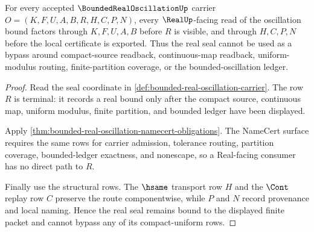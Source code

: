 \begin{theorem}
\label{thm:bounded-real-oscillation-real-seal-nonescape}
For every accepted $\BoundedRealOscillationUp$ carrier $O=(K,F,U,A,B,R,H,C,P,N)$, every $\RealUp$-facing read of the oscillation bound factors through $K,F,U,A,B$ before $R$ is visible, and through $H,C,P,N$ before the local certificate is exported. Thus the real seal cannot be used as a bypass around compact-source readback, continuous-map readback, uniform-modulus routing, finite-partition coverage, or the bounded-oscillation ledger.
\end{theorem}
\begin{proof}
Read the seal coordinate in \autoref{def:bounded-real-oscillation-carrier}. The row $R$ is terminal: it records a real bound only after the compact source, continuous map, uniform modulus, finite partition, and bounded ledger have been displayed.

Apply \autoref{thm:bounded-real-oscillation-namecert-obligations}. The NameCert surface requires the same rows for carrier admission, tolerance routing, partition coverage, bounded-ledger exactness, and nonescape, so a Real-facing consumer has no direct path to $R$.

Finally use the structural rows. The $\hsame$ transport row $H$ and the $\Cont$ replay row $C$ preserve the route componentwise, while $P$ and $N$ record provenance and local naming. Hence the real seal remains bound to the displayed finite packet and cannot bypass any of its compact-uniform rows.
\end{proof}




